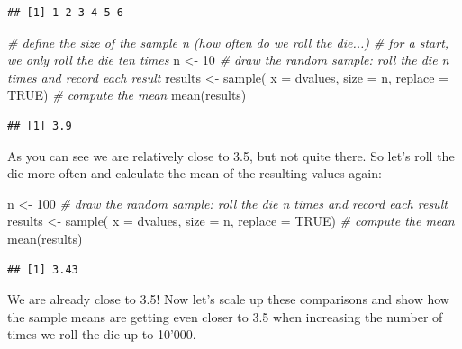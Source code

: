 \documentclass[
  12pt,
]{style/krantz}
\newenvironment{Shaded}{\begin{snugshade}}{\end{snugshade}}
\newcommand{\AttributeTok}[1]{\textcolor[rgb]{0.77,0.63,0.00}{#1}}
\newcommand{\CommentTok}[1]{\textcolor[rgb]{0.56,0.35,0.01}{\textit{#1}}}
\newcommand{\ConstantTok}[1]{\textcolor[rgb]{0.00,0.00,0.00}{#1}}
\newcommand{\DecValTok}[1]{\textcolor[rgb]{0.00,0.00,0.81}{#1}}
\newcommand{\FunctionTok}[1]{\textcolor[rgb]{0.00,0.00,0.00}{#1}}
\newcommand{\NormalTok}[1]{#1}
\newcommand{\OtherTok}[1]{\textcolor[rgb]{0.56,0.35,0.01}{#1}}
\begin{document}
\begin{verbatim}
## [1] 1 2 3 4 5 6
\end{verbatim}

\begin{Shaded}
\begin{Highlighting}[]
\CommentTok{\# define the size of the sample n (how often do we roll the die...)}
\CommentTok{\# for a start, we only roll the die ten times}
\NormalTok{n }\OtherTok{\textless{}{-}} \DecValTok{10}
\CommentTok{\# draw the random sample: \textquotesingle{}roll the die n times and record each result\textquotesingle{}}
\NormalTok{results }\OtherTok{\textless{}{-}} \FunctionTok{sample}\NormalTok{( }\AttributeTok{x =}\NormalTok{ dvalues, }\AttributeTok{size =}\NormalTok{ n, }\AttributeTok{replace =} \ConstantTok{TRUE}\NormalTok{)}
\CommentTok{\# compute the mean}
\FunctionTok{mean}\NormalTok{(results)}
\end{Highlighting}
\end{Shaded}

\begin{verbatim}
## [1] 3.9
\end{verbatim}

As you can see we are relatively close to 3.5, but not quite there. So let's roll the die more often and calculate the mean of the resulting values again:

\begin{Shaded}
\begin{Highlighting}[]
\NormalTok{n }\OtherTok{\textless{}{-}} \DecValTok{100}
\CommentTok{\# draw the random sample: \textquotesingle{}roll the die n times and record each result\textquotesingle{}}
\NormalTok{results }\OtherTok{\textless{}{-}} \FunctionTok{sample}\NormalTok{( }\AttributeTok{x =}\NormalTok{ dvalues, }\AttributeTok{size =}\NormalTok{ n, }\AttributeTok{replace =} \ConstantTok{TRUE}\NormalTok{)}
\CommentTok{\# compute the mean}
\FunctionTok{mean}\NormalTok{(results)}
\end{Highlighting}
\end{Shaded}

\begin{verbatim}
## [1] 3.43
\end{verbatim}

We are already close to 3.5! Now let's scale up these comparisons and show how the sample means are getting even closer to 3.5 when increasing the number of times we roll the die up to 10'000.
\end{document}
